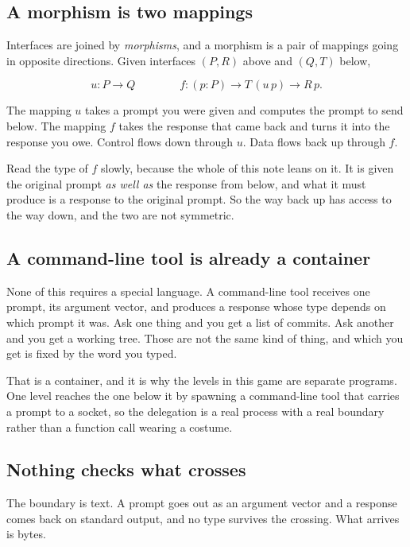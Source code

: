 \documentclass[11pt,a4paper]{article}
\begin{document}
\subsection{A morphism is two mappings}

Interfaces are joined by \emph{morphisms}, and a morphism is a pair of mappings going in opposite
directions. Given interfaces $(P, R)$ above and $(Q, T)$ below,

\[ u : P \to Q \qquad\qquad f : (p : P) \to T\,(u\,p) \to R\,p. \]

The mapping $u$ takes a prompt you were given and computes the prompt to send below. The mapping
$f$ takes the response that came back and turns it into the response you owe. Control flows down
through $u$. Data flows back up through $f$.

Read the type of $f$ slowly, because the whole of this note leans on it. It is given the original
prompt \emph{as well as} the response from below, and what it must produce is a response to the original
prompt. So the way back up has access to the way down, and the two are not symmetric.

\subsection{A command-line tool is already a container}

None of this requires a special language. A command-line tool receives one prompt, its argument
vector, and produces a response whose type depends on which prompt it was. Ask one thing and you get
a list of commits. Ask another and you get a working tree. Those are not the same kind of thing,
and which you get is fixed by the word you typed.

That is a container, and it is why the levels in this game are separate programs. One level
reaches the one below it by spawning a command-line tool that carries a prompt to a socket, so
the delegation is a real process with a real boundary rather than a function call wearing a
costume.

\subsection{Nothing checks what crosses}
\label{sec:crosses}

The boundary is text. A prompt goes out as an argument vector and a response comes back on standard
output, and no type survives the crossing. What arrives is bytes.
\end{document}
